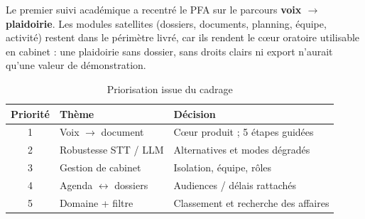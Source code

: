 Le premier suivi académique a recentré le PFA sur le parcours \textbf{voix $\rightarrow$ plaidoirie}. Les modules satellites (dossiers, documents, planning, équipe, activité) restent dans le périmètre livré, car ils rendent le cœur oratoire utilisable en cabinet : une plaidoirie sans dossier, sans droits clairs ni export n'aurait qu'une valeur de démonstration.

\begin{table}[H]
\centering
\caption{Priorisation issue du cadrage}
\label{tab:prio}
\small
\begin{tabular}{@{}clp{8.8cm}@{}}
\toprule
\textbf{Priorité} & \textbf{Thème} & \textbf{Décision} \\
\midrule
1 & Voix $\rightarrow$ document & Cœur produit ; 5 étapes guidées \\
2 & Robustesse STT / LLM & Alternatives et modes dégradés \\
3 & Gestion de cabinet & Isolation, équipe, rôles \\
4 & Agenda $\leftrightarrow$ dossiers & Audiences / délais rattachés \\
5 & Domaine + filtre & Classement et recherche des affaires \\
\bottomrule
\end{tabular}
\end{table}
